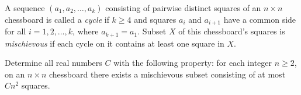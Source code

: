 A sequence $(a_1, a_2,\ldots, a_k)$ consisting of pairwise distinct squares of an $n\times n$ chessboard is called a \textit{cycle} if $k\geq 4$ and squares $a_i$ and $a_{i+1}$ have a common side for all $i=1,2,\ldots, k$, where $a_{k+1}=a_1$. Subset $X$ of this chessboard's squares is \textit{mischievous} if each cycle on it contains at least one square in $X$.

Determine all real numbers $C$ with the following property: for each integer $n\geq 2$, on an $n\times n$ chessboard there exists a mischievous subset consisting of at most $Cn^2$ squares.
